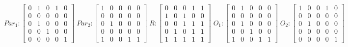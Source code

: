      $$
        Par_{1} : \begin{bmatrix}
            0 & 1 & 0 & 1 & 0 \\
            0 & 0 & 0 & 0 & 0 \\
            0 & 1 & 0 & 0 & 0 \\
			0 & 0 & 1 & 0 & 0 \\
            0 & 0 & 0 & 0 & 1 
        \end{bmatrix}
        \;
        Par_{2} : \begin{bmatrix}
            1 & 0 & 0 & 0 & 0 \\
            0 & 0 & 0 & 0 & 0 \\
            0 & 1 & 0 & 0 & 0 \\
            0 & 0 & 0 & 0 & 0 \\
            1 & 0 & 0 & 1 & 1
        \end{bmatrix}
        \;
        R : \begin{bmatrix}
            0 & 0 & 0 & 1 & 1 \\
            1 & 0 & 1 & 0 & 0 \\
            0 & 0 & 1 & 1 & 1 \\
            0 & 1 & 0 & 1 & 1 \\
            1 & 1 & 1 & 1 & 1
        \end{bmatrix}
        \;
        O_{1} : \begin{bmatrix}
            0 & 1 & 0 & 0 & 0 \\
            0 & 0 & 0 & 0 & 0 \\
            0 & 1 & 0 & 0 & 0 \\
            0 & 0 & 1 & 0 & 0 \\
            1 & 0 & 0 & 1 & 1
        \end{bmatrix}
        \;
        O_{2} : \begin{bmatrix}
            1 & 0 & 0 & 1 & 0 \\
            0 & 0 & 0 & 0 & 0 \\
            0 & 1 & 0 & 0 & 0 \\
            0 & 0 & 0 & 0 & 0 \\
            0 & 0 & 0 & 0 & 1
        \end{bmatrix}
    $$ 
